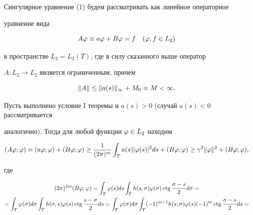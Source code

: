 \begin{pf}


Сингулярное уравнение (1) будем рассматривать как линейное операторное 


уравнение вида


\begin{equation}


A\vp\equiv a\vp + B\vp = f\quad (\vp, f \in L_2)


\end{equation}


в пространстве $L_2 = L_2(T)$, где в силу сказанного выше оператор 


$A:L_2\to L_2$ является ограниченным, причем


\begin{equation}


\|A\|\lea \|a(s)\|_\infty + M_0 \equiv M< \infty.


\end{equation}





Пусть выполнено условие I теоремы и $a(s)>0$ (случай $a(s)<0$ рассматривается 


аналогично). Тогда для любой функции $\varphi\in L_2$ находим


\begin{equation}


(A\vp;\vp) = (a\vp;\vp)+(B\vp;\vp)\gea \frac{1}{(2\pi)^m}


\int_T a(s)|\vp(s)|^2 ds +


(B\vp;\vp)\gea \gamma^2\|\vp\|^2 + (B\vp;\vp),


\end{equation}


где


\begin{multline*}


(2\pi)^{2m}(B\vp;\vp) = \int_{T} \vp(s)ds \int_T h(s,\sigma)\vp(\sigma)


\ctg \frac{\sigma-s}{2}d\sigma = \\


%


=\int_{T}\vp(\sigma)d\sigma \int_{T} h(\sigma,s)\vp(s)\ctg \frac{s-\sigma}{2}ds =


\int_T\vp(\sigma)d\sigma \int_T (-1)^{m-1}h(s,\sigma)\vp(s)(-1)^m \ctg


\frac{\sigma-s}{2}ds = \\


%



\end{multline*}
\end{pf}
